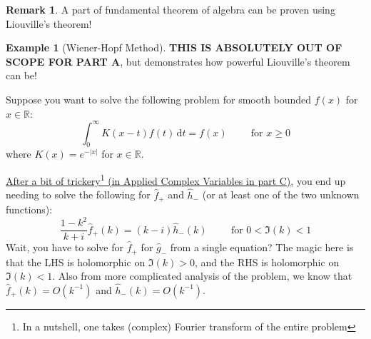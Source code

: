 \documentclass[a4paper, 12pt]{article}
\theoremstyle{definition}
\newtheorem{example}{Example}
\newtheorem{remark}{Remark}
\numberwithin{theorem}{section}
\numberwithin{definition}{section}
\numberwithin{exercise}{section}
\numberwithin{remark}{section}
\numberwithin{figure}{section}
\numberwithin{example}{section}
\newcommand{\R}{\mathbb{R}}
\newcommand{\intd}{\,\text{d}}
\begin{document}
\begin{remark}
    A part of fundamental theorem of algebra can be proven using Liouville's theorem!
\end{remark}
\begin{example}[Wiener-Hopf Method]
    \textbf{THIS IS ABSOLUTELY OUT OF SCOPE FOR PART A},
    but demonstrates how powerful Liouville's theorem can be!

    Suppose you want to solve the following problem for smooth bounded $f(x)$ for $x \in \R$:
    \begin{equation*}
        \int_{0}^{\infty} K (x-t) f(t) \intd t = f(x) \hspace{1cm} \text{for } x\geq 0
    \end{equation*}
    where $K(x) = e^{-|x|}$ for $x \in \R$.

    \ul{After a bit of trickery\footnote{In a nutshell, one takes (complex) Fourier transform of the entire problem} (in Applied Complex Variables in part C)},
    you end up needing to solve the following for
    $\hat f_{+}$ and $\hat h_{-}$ (or at least one of the two unknown functions):
    \begin{equation*}
        \frac{1-k^2}{k+i} \hat f_{+} (k) = \left( k-i \right) \hat h_{-}(k) \hspace{1cm} \text{for } 0 < \Im (k) < 1
    \end{equation*}
    Wait, you have to solve for $\hat f_{+}$ for $\hat g_{-}$ from a single equation?
    The magic here is that the LHS is holomorphic on $\Im (k) > 0$,
    and the RHS is holomorphic on $\Im (k) < 1$.
    Also from more complicated analysis of the problem, we know that
    $\hat f_{+}(k) = O\left( k^{-1} \right)$ and $\hat h_{-} (k) = O\left( k^{-1} \right)$.


\end{example}
\end{document}
